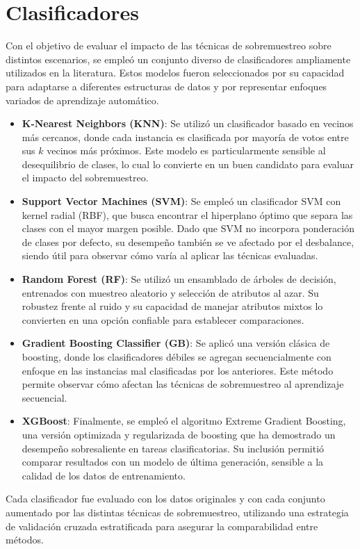 \section{Clasificadores}

Con el objetivo de evaluar el impacto de las técnicas de sobremuestreo sobre distintos escenarios, se empleó un conjunto diverso de clasificadores ampliamente utilizados en la literatura. Estos modelos fueron seleccionados por su capacidad para adaptarse a diferentes estructuras de datos y por representar enfoques variados de aprendizaje automático.

\begin{itemize}
    \item \textbf{K-Nearest Neighbors (KNN)}: Se utilizó un clasificador basado en vecinos más cercanos, donde cada instancia es clasificada por mayoría de votos entre sus $k$ vecinos más próximos. Este modelo es particularmente sensible al desequilibrio de clases, lo cual lo convierte en un buen candidato para evaluar el impacto del sobremuestreo.
    
    \item \textbf{Support Vector Machines (SVM)}: Se empleó un clasificador SVM con kernel radial (RBF), que busca encontrar el hiperplano óptimo que separa las clases con el mayor margen posible. Dado que SVM no incorpora ponderación de clases por defecto, su desempeño también se ve afectado por el desbalance, siendo útil para observar cómo varía al aplicar las técnicas evaluadas.
    
    \item \textbf{Random Forest (RF)}: Se utilizó un ensamblado de árboles de decisión, entrenados con muestreo aleatorio y selección de atributos al azar. Su robustez frente al ruido y su capacidad de manejar atributos mixtos lo convierten en una opción confiable para establecer comparaciones.
    
    \item \textbf{Gradient Boosting Classifier (GB)}: Se aplicó una versión clásica de boosting, donde los clasificadores débiles se agregan secuencialmente con enfoque en las instancias mal clasificadas por los anteriores. Este método permite observar cómo afectan las técnicas de sobremuestreo al aprendizaje secuencial.
    
    \item \textbf{XGBoost}: Finalmente, se empleó el algoritmo Extreme Gradient Boosting, una versión optimizada y regularizada de boosting que ha demostrado un desempeño sobresaliente en tareas clasificatorias. Su inclusión permitió comparar resultados con un modelo de última generación, sensible a la calidad de los datos de entrenamiento.
\end{itemize}

Cada clasificador fue evaluado con los datos originales y con cada conjunto aumentado por las distintas técnicas de sobremuestreo, utilizando una estrategia de validación cruzada estratificada para asegurar la comparabilidad entre métodos.
